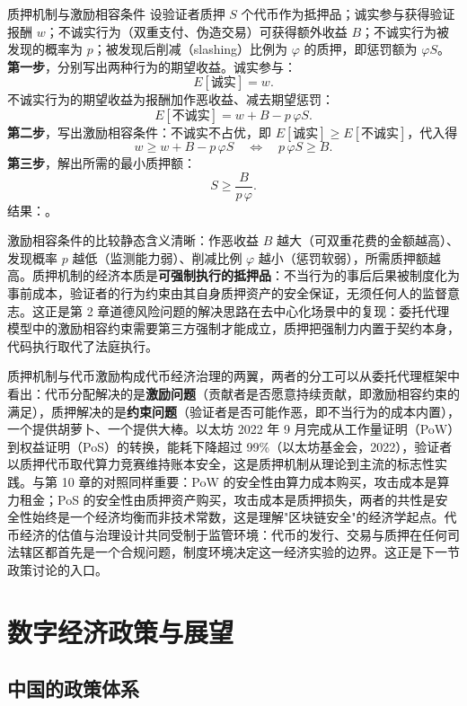 \begin{derivation}{质押机制与激励相容条件}{}
设验证者质押 $S$ 个代币作为抵押品；诚实参与获得验证报酬 $w$；不诚实行为（双重支付、伪造交易）可获得额外收益 $B$；不诚实行为被发现的概率为 $p$；被发现后削减（slashing）比例为 $\varphi$ 的质押，即惩罚额为 $\varphi S$。\textbf{第一步}，分别写出两种行为的期望收益。诚实参与：
\[
E[\text{诚实}] = w.
\]
不诚实行为的期望收益为报酬加作恶收益、减去期望惩罚：
\[
E[\text{不诚实}] = w + B - p\,\varphi S.
\]
\textbf{第二步}，写出激励相容条件：不诚实不占优，即 $E[\text{诚实}] \geq E[\text{不诚实}]$，代入得
\[
w \geq w + B - p\,\varphi S
\quad\Longleftrightarrow\quad
p\,\varphi S \geq B.
\]
\textbf{第三步}，解出所需的最小质押额：
\[
S \geq \frac{B}{p\,\varphi}.
\]
结果：。
\end{derivation}

激励相容条件的比较静态含义清晰：作恶收益 $B$ 越大（可双重花费的金额越高）、发现概率 $p$ 越低（监测能力弱）、削减比例 $\varphi$ 越小（惩罚软弱），所需质押额越高。质押机制的经济本质是\textbf{可强制执行的抵押品}：不当行为的事后后果被制度化为事前成本，验证者的行为约束由其自身质押资产的安全保证，无须任何人的监督意志。这正是第 2 章道德风险问题的解决思路在去中心化场景中的复现：委托代理模型中的激励相容约束需要第三方强制才能成立，质押把强制力内置于契约本身，代码执行取代了法庭执行。

质押机制与代币激励构成代币经济治理的两翼，两者的分工可以从委托代理框架中看出：代币分配解决的是\textbf{激励问题}（贡献者是否愿意持续贡献，即激励相容约束的满足），质押解决的是\textbf{约束问题}（验证者是否可能作恶，即不当行为的成本内置），一个提供胡萝卜、一个提供大棒。以太坊 2022 年 9 月完成从工作量证明（PoW）到权益证明（PoS）的转换，能耗下降超过 99\%（以太坊基金会，2022），验证者以质押代币取代算力竞赛维持账本安全，这是质押机制从理论到主流的标志性实践。与第 10 章的对照同样重要：PoW 的安全性由算力成本购买，攻击成本是算力租金；PoS 的安全性由质押资产购买，攻击成本是质押损失，两者的共性是安全性始终是一个经济均衡而非技术常数，这是理解"区块链安全"的经济学起点。代币经济的估值与治理设计共同受制于监管环境：代币的发行、交易与质押在任何司法辖区都首先是一个合规问题，制度环境决定这一经济实验的边界。这正是下一节政策讨论的入口。

\section{数字经济政策与展望}

\subsection{中国的政策体系}

